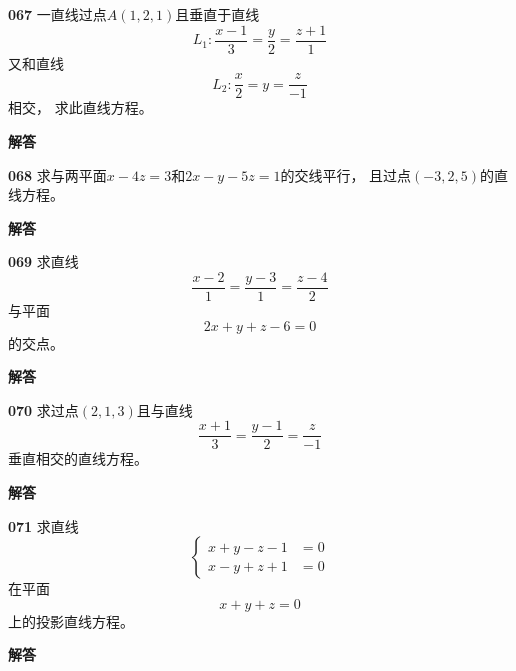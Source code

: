 \documentclass[a4paper,10pt]{article} %
\begin{document}


\textheight


\par\noindent \textbf{067} \quad 一直线过点$A(1,2,1)$且垂直于直线
$$ L_1: \frac{x-1}{3}=\frac{y}{2}=\frac{z+1}{1}$$
又和直线
$$ L_2: \frac{x}{2}=y=\frac{z}{-1}$$
相交， 求此直线方程。
\par\noindent \textbf{ 解答}





\textheight


\par\noindent \textbf{068} \quad 求与两平面$x-4z=3$和$2x-y-5z=1$的交线平行， 且过点$(-3,2,5)$的直线方程。
\par\noindent \textbf{ 解答}





\textheight


\par\noindent \textbf{069} \quad 求直线
$$\frac{x-2}{1}=\frac{y-3}{1}=\frac{z-4}{2}$$
与平面
$$2x+y+z-6=0$$
的交点。
\par\noindent \textbf{ 解答}





\textheight


\par\noindent \textbf{070} \quad 求过点$(2,1,3)$且与直线
$$\frac{x+1}{3}=\frac{y-1}{2}=\frac{z}{-1}$$
垂直相交的直线方程。
\par\noindent \textbf{ 解答}





\textheight


\par\noindent \textbf{071} \quad 求直线
\begin{equation*}    %
 \begin{cases}
    x+y-z-1 & =0 \\
    x-y+z+1 & =0
 \end{cases}                
\end{equation*}
在平面
$$x+y+z=0$$
上的投影直线方程。
\par\noindent \textbf{ 解答}
\end{document}
